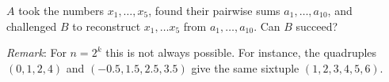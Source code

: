 $A$ took the numbers $x_1, \ldots, x_5$, found their pairwise sums $a_1, \ldots, a_{10}$, and challenged $B$ to reconstruct $x_1, \ldots x_5$ from $a_1, \ldots, a_{10}$. Can $B$ succeed?

\emph{Remark}: For $n = 2^k$ this is not always possible. For instance, the quadruples $(0, 1, 2, 4)$ and $(-0.5, 1.5, 2.5, 3.5)$ give the same sixtuple $(1, 2, 3, 4, 5, 6)$.
